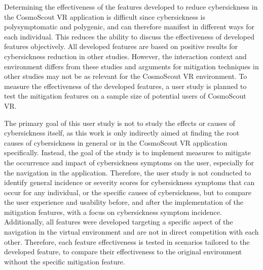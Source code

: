 Determining the effectiveness of the features developed to reduce cybersickness in the CosmoScout VR application is
difficult since cybersickness is polysymptomatic and polygenic, and can therefore manifest in different ways for each
individual.
This reduces the ability to discuss the effectiveness of developed features objectively.
All developed features are based on positive results for cybersickness reduction in other studies.
However, the interaction context and environment differs from these studies and arguments for mitigation techniques
in other studies may not be as relevant for the CosmoScout VR environment.
To measure the effectiveness of the developed features, a user study is planned to test the mitigation features on a
sample size of potential users of CosmoScout VR\@.

The primary goal of this user study is not to study the effects or causes of cybersickness itself, as this work is
only indirectly aimed at finding the root causes of cybersickness in general or in the CosmoScout VR application
specifically.
Instead, the goal of the study is to implement measures to mitigate the occurrence and impact of cybersickness
symptoms on the user, especially for the navigation in the application.
Therefore, the user study is not conducted to identify general incidence or severity scores for cybersickness symptoms
that can occur for any individual, or the specific causes of cybersickness, but to compare the user experience and
usability before, and after the implementation of the mitigation features, with a focus on cybersickness symptom
incidence.
Additionally, all features were developed targeting a specific aspect of the navigation in the virtual environment
and are not in direct competition with each other.
Therefore, each feature effectiveness is tested in scenarios tailored to the developed feature, to compare their
effectiveness to the original environment without the specific mitigation feature.


